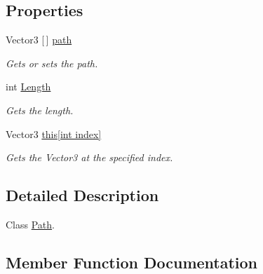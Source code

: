 \subsection*{Properties}
\begin{DoxyCompactItemize}
\item 
Vector3 \mbox{[}$\,$\mbox{]} \hyperlink{class_radical_library_1_1_spline_1_1_path_a30b8ec768fb58165f56d040384cc1e0e}{path}
\begin{DoxyCompactList}\small\item\em Gets or sets the path. \end{DoxyCompactList}\item 
int \hyperlink{class_radical_library_1_1_spline_1_1_path_aedc28e4d2345dea1512425cc2438e82d}{Length}
\begin{DoxyCompactList}\small\item\em Gets the length. \end{DoxyCompactList}\item 
Vector3 \hyperlink{class_radical_library_1_1_spline_1_1_path_a505ac35b3086ec5b8117259ecef2ee1e}{this\mbox{[}int index\mbox{]}}
\begin{DoxyCompactList}\small\item\em Gets the Vector3 at the specified index. \end{DoxyCompactList}\end{DoxyCompactItemize}


\subsection{Detailed Description}
Class \hyperlink{class_radical_library_1_1_spline_1_1_path}{Path}. 



\subsection{Member Function Documentation}
\mbox{\label{class_radical_library_1_1_spline_1_1_path_a3cb523b249610fcb64f4a3387b881304}} 
